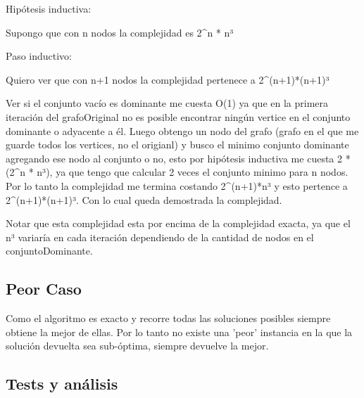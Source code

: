 Hipótesis inductiva:

Supongo que con n nodos la complejidad es 2^n * n³

Paso inductivo:

Quiero ver que con n+1 nodos la complejidad pertenece a 2^(n+1)*(n+1)³

Ver si el conjunto vacío es dominante me cuesta O(1) ya que en la primera iteración del grafoOriginal no es posible encontrar ningún vertice en el conjunto dominante o adyacente a él. Luego obtengo un nodo del grafo (grafo en el que me guarde todos los vertices, no el origianl) y busco el minimo conjunto dominante agregando ese nodo al conjunto o no, esto por hipótesis inductiva me cuesta 2 * (2^n * n³), ya que tengo que calcular 2 veces el conjunto minimo para n nodos. Por lo tanto la complejidad me termina costando  2^(n+1)*n³ y esto pertence a 2^(n+1)*(n+1)³. Con lo cual queda demostrada la complejidad.

Notar que esta complejidad esta por encima de la complejidad exacta, ya que el n³ variaría en cada iteración dependiendo de la cantidad de nodos en el conjuntoDominante.


\subsection{Peor Caso}

Como el algoritmo es exacto y recorre todas las soluciones posibles siempre obtiene la mejor de ellas. Por lo tanto no existe una 'peor' instancia
en la que la solución devuelta sea sub-óptima, siempre devuelve la mejor.

\subsection{Tests y análisis}



